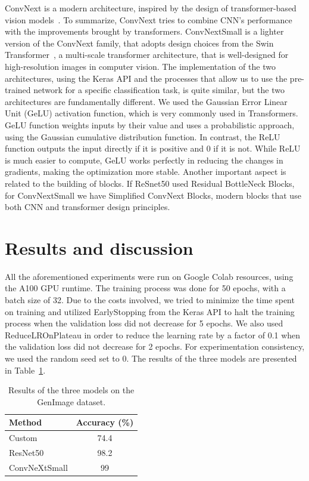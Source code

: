 \documentclass[runningheads]{llncs}
\begin{document}
ConvNext is a modern architecture, inspired by the design of transformer-based vision models~\cite{liu2022convnet}. To summarize, ConvNext tries to combine CNN's performance with the improvements brought by transformers. ConvNextSmall is a lighter version of the ConvNext family, that adopts design choices from the Swin Transformer~\cite{liu2021swin}, a multi-scale transformer architecture, that is well-designed for high-resolution images in computer vision. The implementation of the two architectures, using the Keras API and the processes that allow us to use the pre-trained network for a specific classification task,  is quite similar, but the two architectures are fundamentally different. We used the Gaussian Error Linear Unit (GeLU) activation function, which is very commonly used in Transformers. GeLU function weights inputs by their value and uses a probabilistic approach, using the Gaussian cumulative distribution function. In contrast, the ReLU function outputs the input directly if it is positive and 0 if it is not. While ReLU is much easier to compute, GeLU works perfectly in reducing the changes in gradients, making the optimization more stable. Another important aspect is related to the building of blocks. If ReSnet50 used Residual BottleNeck Blocks, for ConvNextSmall we have Simplified ConvNext Blocks, modern blocks that use both CNN and transformer design principles.

%
%
\section{Results and discussion}
All the aforementioned experiments were run on Google Colab resources, using the A100 GPU runtime. The training process was done for 50 epochs, with a batch size of 32. Due to the costs involved, we tried to minimize the time spent on training and utilized EarlyStopping from the Keras API to halt the training process when the validation loss did not decrease for 5 epochs. We also used ReduceLROnPlateau in order to reduce the learning rate by a factor of 0.1 when the validation loss did not decrease for 2 epochs. For experimentation consistency, we used the random seed set to 0. The results of the three models are presented in Table~\ref{tab:simpleresults}.

\begin{table}
    \centering
    \caption{Results of the three models on the GenImage dataset.}\label{tab1}
    \begin{tabular}{l|c}
    \hline
    Method & Accuracy (\%) \\
    \hline
    Custom &  74.4 \\
    ResNet50 & 98.2 \\
    ConvNeXtSmall & 99 \\
    \hline
    \end{tabular}
    \label{tab:simpleresults}
\end{table}
\end{document}
